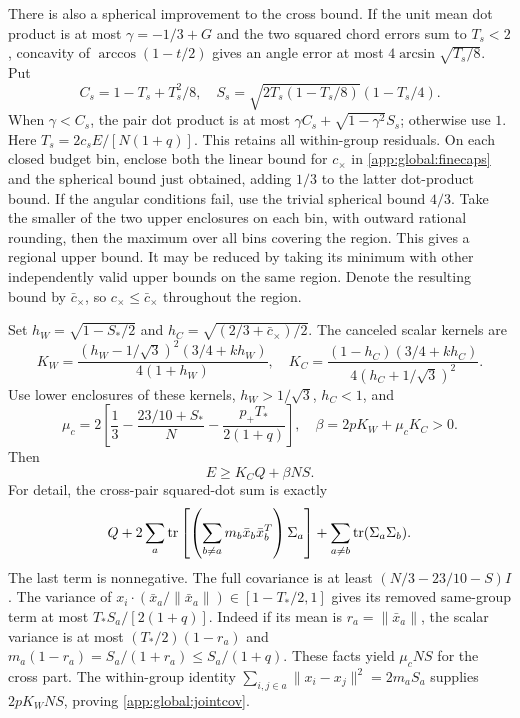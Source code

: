 There is also a spherical improvement to the cross bound. If the unit
mean dot product is at most $\gamma=-1/3+G$ and the two squared chord
errors sum to $T_s<2$, concavity of $\arccos(1-t/2)$ gives an angle
error at most $4\arcsin\sqrt{T_s/8}$. Put
\[
 C_s=1-T_s+T_s^2/8,\quad
 S_s=\sqrt{2T_s(1-T_s/8)}(1-T_s/4).
\]
When $\gamma<C_s$, the pair dot product is at most
$\gamma C_s+\sqrt{1-\gamma^2}S_s$; otherwise use $1$.
Here $T_s=2c_sE/[N(1+q)]$. This retains all within-group residuals.
On each closed budget bin, enclose both the linear bound for $c_\times$
in \eqref{app:global:finecaps} and the spherical bound just obtained,
adding $1/3$ to the latter dot-product bound. If the angular conditions
fail, use the trivial spherical bound $4/3$. Take the smaller of the
two upper enclosures on each bin, with outward rational rounding,
then the maximum over all bins covering the region. This gives a
regional upper bound. It may be reduced by taking its minimum with
other independently valid upper bounds on the same region. Denote the
resulting bound by $\bar c_\times$, so $c_\times\le\bar c_\times$
throughout the region.

Set $h_W=\sqrt{1-S_*/2}$ and
$h_C=\sqrt{(2/3+\bar c_\times)/2}$. The canceled scalar kernels are
\[
 K_W=\frac{(h_W-1/\sqrt3)^2(3/4+kh_W)}{4(1+h_W)},\quad
 K_C=\frac{(1-h_C)(3/4+kh_C)}{4(h_C+1/\sqrt3)^2}.
\]
Use lower enclosures of these kernels, $h_W>1/\sqrt3$, $h_C<1$, and
\begin{equation}\label{app:global:covariance}
 \mu_c=2\left[\frac13-\frac{23/10+S_*}{N}
                   -\frac{p_+T_*}{2(1+q)}\right],\quad
 \beta=2pK_W+\mu_cK_C>0.
\end{equation}
Then
\begin{equation}\label{app:global:jointcov}
 E\ge K_CQ+\beta NS.
\end{equation}
For detail, the cross-pair squared-dot sum is exactly
\[
 Q+2\sum_a\operatorname{tr}\left[\left(\sum_{b\ne a}m_b\bar x_b\bar x_b^T\right)
 \Sigma_a\right]+\sum_{a\ne b}\operatorname{tr}(\Sigma_a\Sigma_b).
\]
The last term is nonnegative. The full covariance is at least
$(N/3-23/10-S)I$. The variance of
$x_i\cdot(\bar x_a/\|\bar x_a\|)\in[1-T_*/2,1]$ gives its removed
same-group term at most $T_*S_a/[2(1+q)]$.
Indeed if its mean is $r_a=\|\bar x_a\|$, the scalar variance is at
most $(T_*/2)(1-r_a)$ and
$m_a(1-r_a)=S_a/(1+r_a)\le S_a/(1+q)$.
These facts yield $\mu_cNS$ for the cross part. The within-group
identity $\sum_{i,j\in a}\|x_i-x_j\|^2=2m_aS_a$ supplies
$2pK_WNS$, proving \eqref{app:global:jointcov}.

